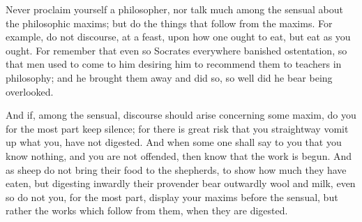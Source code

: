 Never proclaim  yourself a philosopher, nor  talk much among the  sensual about
the philosophic  maxims; but  do the  things that follow  from the  maxims. For
example, do not  discourse, at a feast, upon  how one ought to eat,  but eat as
you ought. For remember that  even so Socrates everywhere banished ostentation,
so that men used  to come to him desiring him to recommend  them to teachers in
philosophy; and  he brought them  away and  did so, so  well did he  bear being
overlooked.

And if, among the sensual, discourse should arise concerning some maxim, do you
for the most  part keep silence; for  there is great risk  that you straightway
vomit up what you,  have not digested. And when some one shall  say to you that
you know nothing, and  you are not offended, then know that  the work is begun.
And as sheep  do not bring their food  to the shepherds, to show  how much they
have  eaten, but  digesting inwardly  their provender  bear outwardly  wool and
milk, even  so do not you,  for the most  part, display your maxims  before the
sensual, but rather the works which follow from them, when they are digested.
